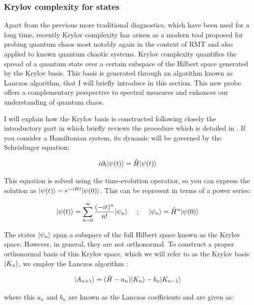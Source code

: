 \documentclass[11pt,a4paper]{article}
\begin{document}
\subsubsection{Krylov complexity for states}

Apart from the previous more traditional diagnostics, which have been used for a long time, recently Krylov complexity has arisen as a modern tool proposed for probing quantum chaos \cite{Balasubramanian_2022,Parker_2019} most notably again in the context of RMT and also applied to known quantum chaotic systems. Krylov complexity quantifies the spread of a quantum state over a certain subspace of the Hilbert space generated by the Krylov basis. This basis is generated through an algorithm known as Lanczos algorithm, that I will briefly introduce in this section. This new probe offers a complementary perspective to spectral measures and enhances our understanding of quantum chaos.

I will explain how the Krylov basis is constructed following closely the introductory part in \cite{Jeong_2025} which briefly reviews the procedure which is detailed in \cite{Balasubramanian_2022}. If you consider a Hamiltonian system, its dynamic will be governed by the Schrödinger equation:

\begin{equation}
    i\partial_t\lvert\psi(t)\rangle = \hat{H}\lvert\psi(t)\rangle
\end{equation}

This equation is solved using the time-evolution operatior, so you can express the solution as $\lvert\psi(t)\rangle=e^{-iHt}\lvert\psi(0)\rangle$. This can be represent in terms of a power series:

\begin{equation}
    \lvert\psi(t)\rangle=\sum_{n=0}^\infty \frac{(-it)^n}{n!}\lvert\psi_n\rangle ~~~~;~~~~ \lvert\psi_n\rangle = \hat{H}^n\lvert\psi(0)\rangle
\end{equation}

The states $\lvert\psi_n\rangle$ span a subspace of the full Hilbert space known as the Krylov space. However, in general, they are not orthonormal. To construct a proper orthonormal basis of this Krylov space, which we will refer to as the Krylov basis $\lvert K_n\rangle$, we employ the Lanczos algorithm \cite{lanczos_iteration_1950}:

\begin{equation}
    \lvert A_{n+1}\rangle = (\hat{H}-a_n)\lvert K_n\rangle-b_n\lvert K_{n-1}\rangle
\end{equation}

{\noindent where this $a_n$ and $b_n$ are known as the Lanczos coefficients and are given as:}
\end{document}
